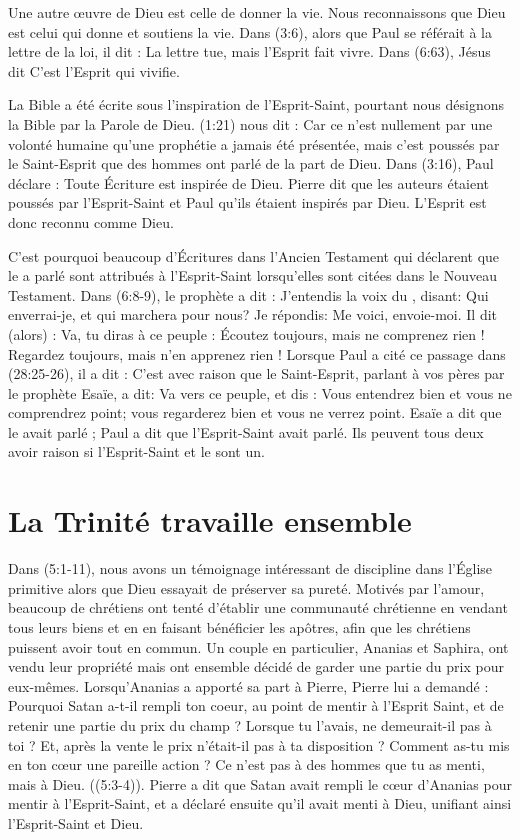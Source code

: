 Une autre œuvre de Dieu est celle de donner la vie. Nous reconnaissons que Dieu est celui qui donne et soutiens la vie. Dans (3:6), alors que Paul se référait à la lettre de la loi, il dit : \og La lettre tue, mais l'Esprit fait vivre. \fg{} Dans (6:63), Jésus dit \og C'est l'Esprit qui vivifie.\fg{}

La Bible a été écrite sous l'inspiration de l'Esprit-Saint, pourtant nous désignons la Bible par la Parole de Dieu. (1:21) nous dit : \og Car ce n'est nullement par une volonté humaine qu'une prophétie a jamais été présentée, mais c'est poussés par le Saint-Esprit que des hommes ont parlé de la part de Dieu. \fg{} Dans (3:16), Paul déclare : \og Toute Écriture est inspirée de Dieu. \fg{} Pierre dit que les auteurs étaient poussés par l'Esprit-Saint et Paul qu'ils étaient inspirés par Dieu. L'Esprit est donc reconnu comme Dieu.

C'est pourquoi beaucoup d'Écritures dans l'Ancien Testament qui déclarent que le \Seigneur{} a parlé sont attribués à l'Esprit-Saint lorsqu'elles sont citées dans le Nouveau Testament. Dans (6:8-9), le prophète a dit : \og J'entendis la voix du \Seigneur{}, disant: Qui enverrai-je, et qui marchera pour nous? Je répondis: Me voici, envoie-moi. Il dit (alors) : Va, tu diras à ce peuple : Écoutez toujours, mais ne comprenez rien ! Regardez toujours, mais n'en apprenez rien ! \fg{} Lorsque Paul a cité ce passage dans (28:25-26), il a dit : \og C'est avec raison que le Saint-Esprit, parlant à vos pères par le prophète Esaïe, a dit: Va vers ce peuple, et dis : Vous entendrez bien et vous ne comprendrez point; vous regarderez bien et vous ne verrez point. \fg{} Esaïe a dit que le \Seigneur{} avait parlé ; Paul a dit que l'Esprit-Saint avait parlé. Ils peuvent tous deux avoir raison si l'Esprit-Saint et le \Seigneur{} sont un.


\section{La Trinité travaille ensemble}

Dans (5:1-11), nous avons un témoignage intéressant de discipline dans l'Église primitive alors que Dieu essayait de préserver sa pureté. Motivés par l'amour, beaucoup de chrétiens ont tenté d'établir une communauté chrétienne en vendant tous leurs biens et en en faisant bénéficier les apôtres, afin que les chrétiens puissent avoir tout en commun. Un couple en particulier, Ananias et Saphira, ont vendu leur propriété mais ont ensemble décidé de garder une partie du prix pour eux-mêmes. Lorsqu'Ananias a apporté sa part à Pierre, Pierre lui a demandé : \og Pourquoi Satan a-t-il rempli ton coeur, au point de mentir à l'Esprit Saint, et de retenir une partie du prix du champ ? Lorsque tu l'avais, ne demeurait-il pas à toi ? Et, après la vente le prix n'était-il pas à ta disposition ? Comment as-tu mis en ton cœur une pareille action ? Ce n'est pas à des hommes que tu as menti, mais à Dieu.  \fg{} ((5:3-4)). Pierre a dit que Satan avait rempli le cœur d'Ananias pour mentir à l'Esprit-Saint, et a déclaré ensuite qu'il avait menti à Dieu, unifiant ainsi l'Esprit-Saint et Dieu.

